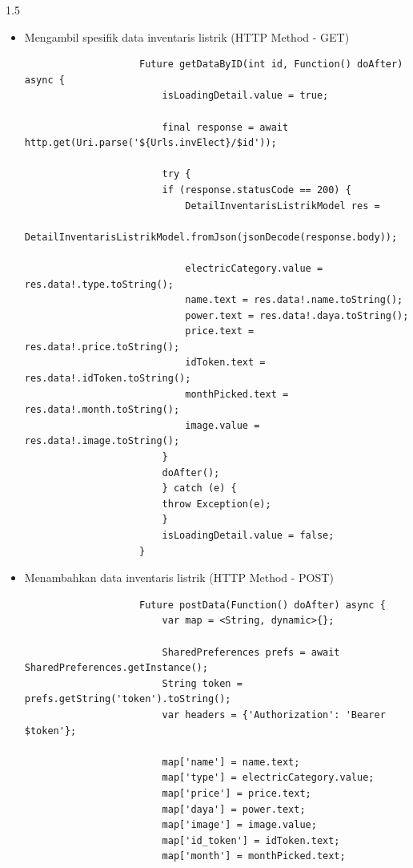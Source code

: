 \begin{spacing}{1.5}
\begin{enumerate}
\begin{enumerate}
\begin{itemize}
\begin{lstlisting}
						final response = await http.get(
							Uri.parse('${Urls.invElect}?type=$type&first=$first&last=$last'),
							headers: headers);

						try {
						if (response.statusCode == 200) {
							InventarisListrikModel res =
								InventarisListrikModel.fromJson(jsonDecode(response.body));

							electricList.value = res;
							inspect(electricList.value.data);
							doAfter();
						}
						} catch (e) {
						throw Exception(e);
						}
						isLoadingPage.value = false;
					}
				\end{lstlisting}

				\item Mengambil spesifik data inventaris listrik (HTTP Method - GET)
				
				\begin{lstlisting}
					Future getDataByID(int id, Function() doAfter) async {
						isLoadingDetail.value = true;

						final response = await http.get(Uri.parse('${Urls.invElect}/$id'));

						try {
						if (response.statusCode == 200) {
							DetailInventarisListrikModel res =
								DetailInventarisListrikModel.fromJson(jsonDecode(response.body));

							electricCategory.value = res.data!.type.toString();
							name.text = res.data!.name.toString();
							power.text = res.data!.daya.toString();
							price.text = res.data!.price.toString();
							idToken.text = res.data!.idToken.toString();
							monthPicked.text = res.data!.month.toString();
							image.value = res.data!.image.toString();
						}
						doAfter();
						} catch (e) {
						throw Exception(e);
						}
						isLoadingDetail.value = false;
					}
				\end{lstlisting}

				\item Menambahkan data inventaris listrik (HTTP Method - POST)
				
				\begin{lstlisting}
					Future postData(Function() doAfter) async {
						var map = <String, dynamic>{};

						SharedPreferences prefs = await SharedPreferences.getInstance();
						String token = prefs.getString('token').toString();
						var headers = {'Authorization': 'Bearer $token'};

						map['name'] = name.text;
						map['type'] = electricCategory.value;
						map['price'] = price.text;
						map['daya'] = power.text;
						map['image'] = image.value;
						map['id_token'] = idToken.text;
						map['month'] = monthPicked.text;


\end{lstlisting}
\end{itemize}
\end{enumerate}
\end{enumerate}
\end{spacing}
